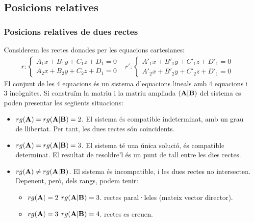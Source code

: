 \documentclass{beamer}
\begin{document}
\subsection{Posicions relatives}
\begin{frame}
  \frametitle{Posicions relatives de dues rectes}
  Considerem les rectes donades per les equacions cartesianes:
  \[
  \begin{array}{cc}
    r:\begin{cases}
        A_1x+B_1y+C_1z+D_1=0\\
        A_2x+B_2y+C_2z+D_1=0
      \end{cases}&
      r':\begin{cases}
        A'_1x+B'_1y+C'_1z+D'_1=0\\
        A'_2x+B'_2y+C'_2z+D'_1=0
      \end{cases}
  \end{array}
  \]
  El conjunt de les 4 equacions és un sistema d'equacions lineals amb 4 equacions i 3 incògnites. Si construïm la matriu  i la matriu ampliada $(\textbf{A}|\textbf{B})$ del sistema es poden presentar les següents situacions:
  \begin{itemize}
    \item $rg(\textbf{A})=rg(\textbf{A}|\textbf{B})=2$. El sistema és compatible indeterminat, amb un grau de llibertat. Per tant, les dues rectes són coincidents.
    \item $rg(\textbf{A})=rg(\textbf{A}|\textbf{B})=3$. El sistema té una única solució, és compatible determinat. El resultat de resoldre'l és un punt de tall entre les dies rectes.
    \item $rg(\textbf{A})\neq rg(\textbf{A}|\textbf{B})$. El sistema és incompatible, i les dues rectes no intersecten. Depenent, però, dels rangs, podem tenir:
    \begin{itemize}
      \item $rg(\textbf{A})=2$ $rg(\textbf{A}|\textbf{B})=3$. rectes paral·leles (mateix vector director).
      \item $rg(\textbf{A})=3$ $rg(\textbf{A}|\textbf{B})=4$. rectes es creuen.
    \end{itemize}
  \end{itemize}
\end{frame}
%
\end{document}
